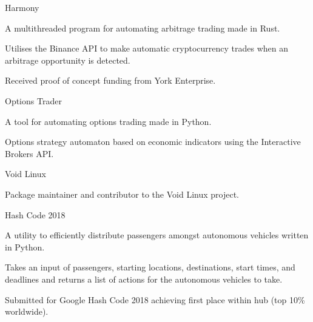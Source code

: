 
\begin{cventries}
  \cventry
    {} %
    {Harmony} %
    {} %
    {} %
    {
      \begin{cvitems} %
        \item {A multithreaded program for automating arbitrage trading made in Rust.}
        \vspace{0.5mm}
		\item {Utilises the Binance API to make automatic cryptocurrency trades when an arbitrage opportunity is detected.}
		\vspace{0.5mm}
		\item {Received proof of concept funding from York Enterprise.}
      \end{cvitems}
    }

  \cventry
    {} %
    {Options Trader} %
    {} %
    {} %
    {
      \begin{cvitems} %
        \item {A tool for automating options trading made in Python.}
        \vspace{0.5mm}
		\item {Options strategy automaton based on economic indicators using the Interactive Brokers API.}
      \end{cvitems}
    }

  \cventry
    {} %
    {Void Linux} %
    {} %
    {} %
    {
      \begin{cvitems} %
      	\item {Package maintainer and contributor to the Void Linux project.}
      \end{cvitems}
    }

  \cventry
    {} %
    {Hash Code 2018} %
    {} %
    {} %
    {
      \begin{cvitems} %
      	\item {A utility to efficiently distribute passengers amongst autonomous vehicles written in Python.}
      	\vspace{0.5mm}
		\item {Takes an input of passengers, starting locations, destinations, start times, and deadlines and returns a list of actions for the autonomous vehicles to take.}
		\vspace{0.5mm}
		\item {Submitted for Google Hash Code 2018 achieving first place within hub (top 10\% worldwide).}
      \end{cvitems}
    }
\end{cventries}
